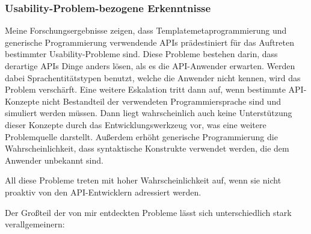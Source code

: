 \subsubsection{Usability-Problem-bezogene Erkenntnisse}
Meine Forschungsergebnisse zeigen, dass Templatemetaprogrammierung und generische Programmierung verwendende APIs prädestiniert für das Auftreten bestimmter Usability-Probleme sind. Diese Probleme bestehen darin, dass derartige APIs Dinge anders lösen, als es die API-Anwender erwarten. Werden dabei Sprachentitätstypen benutzt, welche die Anwender nicht kennen, wird das Problem verschärft. Eine weitere Eskalation tritt dann auf, wenn bestimmte API-Konzepte nicht Bestandteil der verwendeten Programmiersprache sind und simuliert werden müssen. Dann liegt wahrscheinlich auch keine Unterstützung dieser Konzepte durch das Entwicklungswerkzeug vor, was eine weitere Problemquelle darstellt. Außerdem erhöht generische Programmierung die Wahrscheinlichkeit, dass syntaktische Konstrukte verwendet werden, die dem Anwender unbekannt sind.
    
    All diese Probleme treten mit hoher Wahrscheinlichkeit auf, wenn sie nicht proaktiv von den API-Entwicklern adressiert werden.

Der Großteil der von mir entdeckten Probleme lässt sich unterschiedlich stark verallgemeinern:

